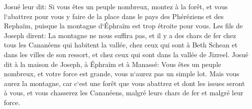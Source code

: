 \verse Josué leur dit: Si vous êtes un peuple nombreux, montez à la forêt, et vous l`abattrez pour vous y faire de la place dans le pays des Phéréziens et des Rephaïm, puisque la montagne d`Éphraïm est trop étroite pour vous. 
\verse Les fils de Joseph dirent: La montagne ne nous suffira pas, et il y a des chars de fer chez tous les Cananéens qui habitent la vallée, chez ceux qui sont à Beth Schean et dans les villes de son ressort, et chez ceux qui sont dans la vallée de Jizreel. 
\verse Josué dit à la maison de Joseph, à Éphraïm et à Manassé: Vous êtes un peuple nombreux, et votre force est grande, vous n`aurez pas un simple lot. 
\verse Mais vous aurez la montagne, car c`est une forêt que vous abattrez et dont les issues seront à vous, et vous chasserez les Cananéens, malgré leurs chars de fer et malgré leur force. 

\chapter{}

